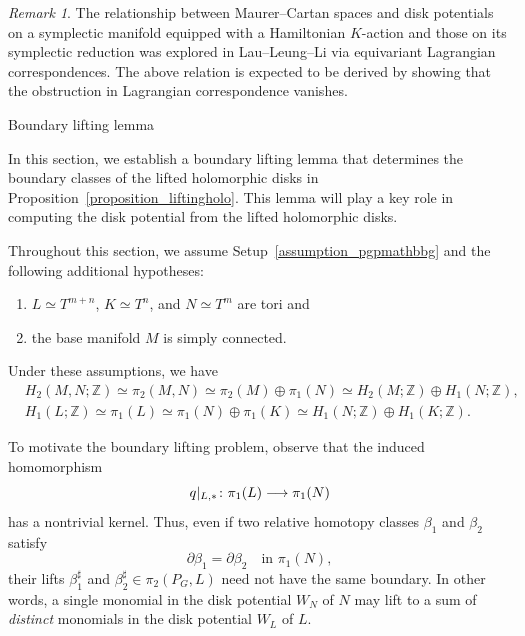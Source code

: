 \documentclass[11pt]{amsart}
\makeatletter
\def\section{\@startsection{section}{1}%
  \z@{-1.2\linespacing\@plus-.5\linespacing}{.8\linespacing}%
  {\normalfont\bfseries\large}}
\theoremstyle{plain}
\theoremstyle{definition}
\theoremstyle{remark}
\newtheorem{remark}[theorem]{Remark}
\newcommand{\Z}{\mathbb{Z}}
\numberwithin{equation}{section} \numberwithin{table}{section}
\def\to{\mathchoice{\longrightarrow}{\rightarrow}{\rightarrow}{\rightarrow}}
\numberwithin{equation}{section}
\makeatother
\begin{document}
\begin{remark}
The relationship between Maurer--Cartan spaces and disk potentials on a symplectic manifold equipped with a Hamiltonian $K$-action and those on its symplectic reduction was explored in Lau--Leung--Li \cite{LLL23} via equivariant Lagrangian correspondences. The above relation is expected to be derived by showing that the obstruction in Lagrangian correspondence vanishes.
\end{remark}








\section{Boundary lifting lemma}\label{sec_boundaryliftinglemma}

In this section, we establish a boundary lifting lemma that determines the boundary classes of the lifted holomorphic disks in Proposition~\ref{proposition_liftingholo}. This lemma will play a key role in computing the disk potential from the lifted holomorphic disks.

Throughout this section, we assume Setup~\ref{assumption_pgpmathbbg} and the following additional hypotheses$\colon$
\begin{enumerate}
\item $L \simeq T^{m+n}$, $K \simeq T^n$, and $N \simeq T^{m}$ are tori and
\item the base manifold $M$ is simply connected. 
\end{enumerate}
Under these assumptions, we have
\begin{align}
\label{equ_splittingH2rel}&H_2(M, N; \Z) \simeq \pi_2(M, N) \simeq \pi_2(M) \oplus \pi_1(N) \simeq H_2(M; \Z) \oplus H_1(N; \Z), \\
\label{equ_splittingH1}&H_1(L; \Z) \simeq \pi_1(L) \simeq \pi_1(N) \oplus \pi_1(K) \simeq H_1(N; \Z) \oplus H_1(K; \Z).
\end{align}

To motivate the boundary lifting problem, observe that the induced homomorphism
\begin{equation}\label{equ_inducedhomoH1}
q |_{L,*} \colon \pi_1(L) \to \pi_1(N)
\end{equation}
has a nontrivial kernel. Thus, even if two relative homotopy classes $\beta_1$ and $\beta_2$ satisfy
$$
\partial \beta_1 = \partial \beta_2 \quad \mbox{in $\pi_1(N)$},
$$
their lifts $\beta_1^\sharp$ and $\beta_2^\sharp \in \pi_2(P_G,L)$ need not have the same boundary. In other words, a single monomial in the disk potential $W_N$ of $N$ may lift to a sum of \emph{distinct} monomials in the disk potential $W_L$ of $L$. 
\end{document}

